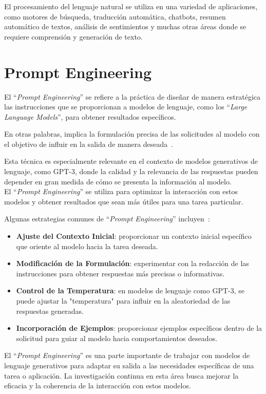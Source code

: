 El procesamiento del lenguaje natural se utiliza en una variedad de 
aplicaciones, como motores de búsqueda, traducción automática, chatbots, 
resumen automático de textos, análisis de sentimientos y 
muchas otras áreas donde se requiere comprensión y generación de texto.\\


\section{Prompt Engineering}
El ``\emph{Prompt Engineering}'' se refiere a la práctica de diseñar de manera
 estratégica las instrucciones que se proporcionan a modelos de lenguaje, 
 como los ``\emph{Large Language Models}'', para obtener resultados específicos. 

En otras palabras, implica la formulación precisa de las solicitudes al modelo 
con el objetivo de influir en la salida de manera deseada~\cite{Solano2023}.

Esta técnica es especialmente relevante en el contexto de modelos 
generativos de lenguaje, como GPT-3, donde la calidad y la 
relevancia de las respuestas pueden depender en gran medida 
de cómo se presenta la información al modelo.\\
El ``\emph{Prompt Engineering}'' se utiliza para optimizar la interacción 
con estos modelos y obtener resultados que sean más útiles 
para una tarea particular.

Algunas estrategias comunes de ``\emph{Prompt Engineering}'' incluyen~\cite{white2023prompt}:
\begin{itemize}
	\item \textbf{Ajuste del Contexto Inicial}: proporcionar un contexto inicial específico que oriente al modelo hacia la tarea deseada.
	\item \textbf{Modificación de la Formulación}: experimentar con la redacción de las instrucciones para obtener respuestas más precisas o informativas.
	\item \textbf{Control de la Temperatura}: en modelos de lenguaje como GPT-3, se puede ajustar la "temperatura" para influir en la aleatoriedad de las respuestas generadas.
	\item \textbf{Incorporación de Ejemplos}: proporcionar ejemplos específicos dentro de la solicitud para guiar al modelo hacia comportamientos deseados.
\end{itemize}
El ``\emph{Prompt Engineering}'' es una parte importante de trabajar con modelos de lenguaje generativos para adaptar su salida a las necesidades específicas de una tarea o aplicación. 
La investigación continua en esta área busca mejorar la eficacia y la coherencia de la interacción con estos modelos.


